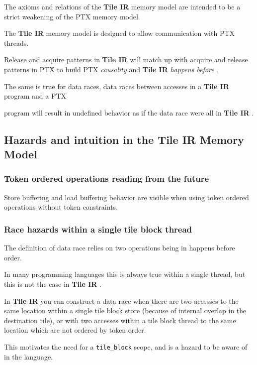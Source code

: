 \documentclass{article}
\begin{document}
The axioms and relations of the \textbf{Tile IR} memory model are intended to be a strict weakening of the PTX memory model.


The \textbf{Tile IR} memory model is designed to allow communication with PTX threads.

Release and acquire patterns in \textbf{Tile IR} will match up with acquire and release patterns in PTX to build PTX \textit{causality} and \textbf{Tile IR} \textit{happens before} .


The same is true for data races, data races between accesses in a \textbf{Tile IR} program and a PTX

program will result in undefined behavior as if the data race were all in \textbf{Tile IR} .



\subsection{Hazards and intuition in the \textbf{Tile IR} Memory Model}

\subsubsection{Token ordered operations reading from the future}

Store buffering and load buffering behavior are visible when using token ordered operations without token constraints.



\subsubsection{Race hazards within a single tile block thread}

The definition of data race relies on two operations being in happens before order.

In many programming languages this is always true within a single thread, but this is not the case in \textbf{Tile IR} .

In \textbf{Tile IR} you can construct a data race when there are two accesses to the same location within a single tile block store (because of internal overlap in the destination tile), or with two accesses within a tile block thread to the same location which are not ordered by token order.

This motivates the need for a \texttt{tile\_block} scope, and is a hazard to be aware of in the language.
\end{document}
